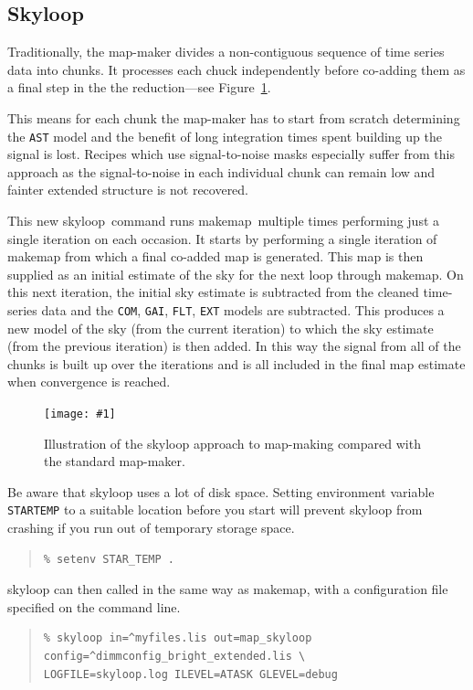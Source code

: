 \documentclass[twoside,11pt]{article}
\newcommand{\htmladdimg}[1]{}
\newcommand{\htmlref}[2]{#1}
\newcommand{\latexhtml}[2]{#1}
\newcommand{\xref}[3]{#1}
\newcommand{\xlabel}[1]{}
\renewcommand{\_}{\texttt{\symbol{95}}}
\newenvironment{myquote}{
   \color{MidnightBlue}\begin{quote}\begin{small}}{
   \end{small}\end{quote}
}
\newcommand{\task}[1]{\textsf{#1}}
\newcommand{\envvar}[1]{\texttt{#1}}
\newcommand{\model}[1]{\texttt{#1}}
\newcommand{\makemap}{\xref{\task{makemap}}{sun258}{MAKEMAP}}
\newcommand{\skyloop}{\xref{\task{skyloop}}{sun258}{SKYLOOP}}
\newcommand{\myfig}[6]{
  \begin{figure}#2
    \centering\texttt{[image: \#1]}
    \typeout{#1 inserted on page \arabic{page}}
    \caption[#5]{\label{#4}\small #6}
  \end{figure}
}
\newcommand{\myfig}[6]{
    \label{#4} \htmladdimg{#1.png}\\
    \\
    Figure: #6\\
  }
\newcommand{\cref}[3]{\latexhtml{#1~\ref{#2}}{\htmlref{#3}{#2}}}
\renewenvironment{myquote}{
      \begin{quote}\begin{small}}{
      \end{small}\end{quote}
   }
\begin{document}
\subsection{\xlabel{skyloop}Skyloop}
\label{sec:skyloop}

Traditionally, the map-maker divides a non-contiguous sequence of time
series data into chunks. It processes each chuck independently
before co-adding them as a final step in the the reduction---see
\cref{Figure}{fig:skyloop}{the figure below}.

This means for each chunk the map-maker has to start from scratch
determining the \model{AST} model and the benefit of long integration
times spent building up the signal is lost. Recipes which use
signal-to-noise masks especially suffer from this approach as the
signal-to-noise in each individual chunk can remain low and fainter
extended structure is not recovered.

This new \skyloop\ command runs \makemap\ multiple times
performing just a single iteration on each occasion. It starts by
performing a single iteration of \task{makemap} from which a final
co-added map is generated. This map is then supplied as an initial
estimate of the sky for the next loop through \task{makemap}. On
this next iteration, the initial sky estimate is subtracted from the
cleaned time-series data and the \model{COM}, \model{GAI},
\model{FLT}, \model{EXT} models are subtracted. This produces a new
model of the sky (from the current iteration) to which the sky
estimate (from the previous iteration) is then added. In this way the
signal from all of the chunks is built up over the iterations and is
all included in the final map estimate when convergence is reached.


\myfig{sc21_skyloop}{[b!]}{width=0.55\linewidth}{fig:skyloop}{
  Illustration of the \task{skyloop} approach}{
  Illustration of the \task{skyloop} approach
  to map-making compared with the standard map-maker.
}

Be aware that \task{skyloop} uses a lot of disk space. Setting
environment variable \envvar{STAR\_TEMP} to a suitable location
before you start will prevent \task{skyloop} from crashing
if you run out of temporary storage space.
\begin{myquote}
\begin{verbatim}
% setenv STAR_TEMP .
\end{verbatim}
\end{myquote}
\task{skyloop} can then called in the same way as \makemap, with
 a configuration file specified on the command line.
\begin{myquote}
\begin{verbatim}
% skyloop in=^myfiles.lis out=map_skyloop config=^dimmconfig_bright_extended.lis \
LOGFILE=skyloop.log ILEVEL=ATASK GLEVEL=debug
\end{verbatim}
\end{myquote}
\end{document}
